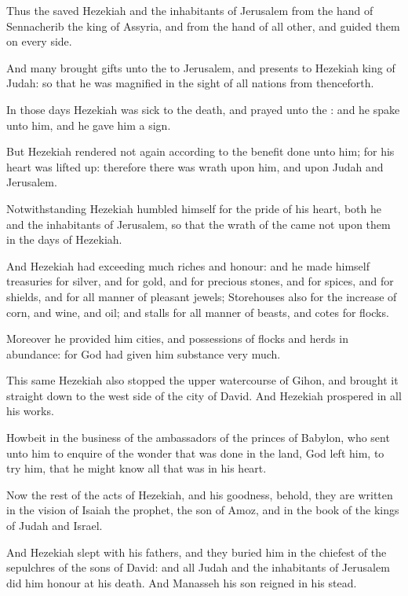 \Verse Thus the \LORD saved Hezekiah and the inhabitants of Jerusalem from the hand of Sennacherib the king of Assyria, and from the hand of all other, and guided them on every side.

\Verse And many brought gifts unto the \LORD to Jerusalem, and presents to Hezekiah king of Judah: so that he was magnified in the sight of all nations from thenceforth.

\Verse In those days Hezekiah was sick to the death, and prayed unto the \LORD: and he spake unto him, and he gave him a sign.

\Verse But Hezekiah rendered not again according to the benefit done unto him; for his heart was lifted up: therefore there was wrath upon him, and upon Judah and Jerusalem.

\Verse Notwithstanding Hezekiah humbled himself for the pride of his heart, both he and the inhabitants of Jerusalem, so that the wrath of the \LORD came not upon them in the days of Hezekiah.

\Verse And Hezekiah had exceeding much riches and honour: and he made himself treasuries for silver, and for gold, and for precious stones, and for spices, and for shields, and for all manner of pleasant jewels; \Verse Storehouses also for the increase of corn, and wine, and oil; and stalls for all manner of beasts, and cotes for flocks.

\Verse Moreover he provided him cities, and possessions of flocks and herds in abundance: for God had given him substance very much.

\Verse This same Hezekiah also stopped the upper watercourse of Gihon, and brought it straight down to the west side of the city of David.  And Hezekiah prospered in all his works.

\Verse Howbeit in the business of the ambassadors of the princes of Babylon, who sent unto him to enquire of the wonder that was done in the land, God left him, to try him, that he might know all that was in his heart.

\Verse Now the rest of the acts of Hezekiah, and his goodness, behold, they are written in the vision of Isaiah the prophet, the son of Amoz, and in the book of the kings of Judah and Israel.

\Verse And Hezekiah slept with his fathers, and they buried him in the chiefest of the sepulchres of the sons of David: and all Judah and the inhabitants of Jerusalem did him honour at his death. And Manasseh his son reigned in his stead.


